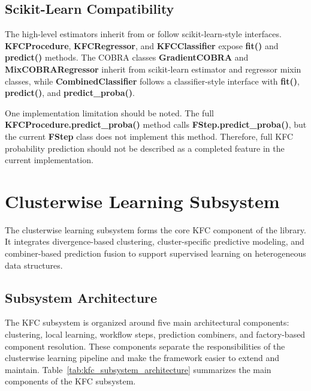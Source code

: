 \subsection{Scikit-Learn Compatibility}

\hs The high-level estimators inherit from or follow scikit-learn-style interfaces. \textbf{KFCProcedure}, \textbf{KFCRegressor}, and \textbf{KFCClassifier} expose \textbf{fit()} and \textbf{predict()} methods. The COBRA classes \textbf{GradientCOBRA} and \textbf{MixCOBRARegressor} inherit from scikit-learn estimator and regressor mixin classes, while \textbf{CombinedClassifier} follows a classifier-style interface with \textbf{fit()}, \textbf{predict()}, and \textbf{predict\_proba()}.

One implementation limitation should be noted. The full \textbf{KFCProcedure.predict\_proba()} method calls \textbf{FStep.predict\_proba()}, but the current \textbf{FStep} class does not implement this method. Therefore, full KFC probability prediction should not be described as a completed feature in the current implementation.


\section{Clusterwise Learning Subsystem}
\label{sec:kfc_subsystem}

\hs The clusterwise learning subsystem forms the core KFC component of the library. It integrates divergence-based clustering, cluster-specific predictive modeling, and combiner-based prediction fusion to support supervised learning on heterogeneous data structures.

\subsection{Subsystem Architecture}

\hs The KFC subsystem is organized around five main architectural components: clustering, local learning, workflow steps, prediction combiners, and factory-based component resolution. These components separate the responsibilities of the clusterwise learning pipeline and make the framework easier to extend and maintain. Table~\ref{tab:kfc_subsystem_architecture} summarizes the main components of the KFC subsystem.

